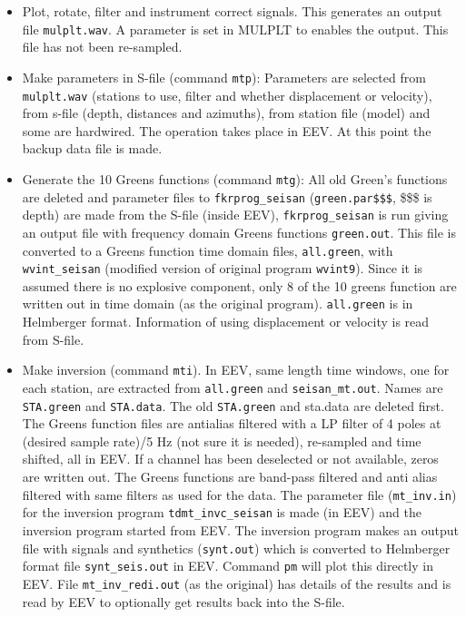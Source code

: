 \begin{itemize}
\item 
Plot, rotate, filter and instrument correct signals. This generates an output file \texttt{mulplt.wav}. A parameter is set in MULPLT to enables the output. This file has not been re-sampled.
\item 
Make parameters in S-file (command \texttt{mtp}): Parameters are selected from \texttt{mulplt.wav} (stations to use, filter and whether displacement or velocity), from s-file (depth, distances and azimuths), from station file (model) and some are hardwired. The operation takes place in EEV. At this point the backup data file is made.
\item 
Generate the 10 Greens functions (command \texttt{mtg}): All old Green's functions are deleted and parameter files to \texttt{fkrprog\_seisan} (\texttt{green.par\$\$\$}, \$\$\$ is depth) are made from the S-file (inside EEV), \texttt{fkrprog\_seisan} is run giving an output file with frequency domain Greens functions \texttt{green.out}. This file is converted to a Greens function time domain files, \texttt{all.green}, with \texttt{wvint\_seisan} (modified version of original program \texttt{wvint9}). Since it is assumed there is no explosive component, only 8 of the 10 greens function are written out in time domain (as the original program). \texttt{all.green} is in Helmberger format. Information of using displacement or velocity is read from S-file. 
\item 
Make inversion (command \texttt{mti}). In EEV, same length time windows, one for each station, are extracted from \texttt{all.green} and \texttt{seisan\_mt.out}. Names are \texttt{STA.green} and \texttt{STA.data}. The old \texttt{STA.green} and sta.data are deleted first. The  Greens function files are antialias filtered with a LP filter of 4 poles at (desired sample rate)/5 Hz (not sure it is needed), re-sampled and time shifted, all in EEV. If a channel has been deselected or not available, zeros are written out. The Greens functions are band-pass filtered and anti alias filtered with same filters as used for the data. The parameter file (\texttt{mt\_inv.in}) for the inversion program \texttt{tdmt\_invc\_seisan} is made (in EEV) and the inversion program started from EEV. The inversion program makes an output file with signals and synthetics (\texttt{synt.out}) which is converted to Helmberger format file \texttt{synt\_seis.out} in EEV. Command \texttt{pm} will plot this directly in EEV. File \texttt{mt\_inv\_redi.out}  (as the original) has details of the results and  is read by EEV to optionally get results back into the S-file.
\end{itemize}

